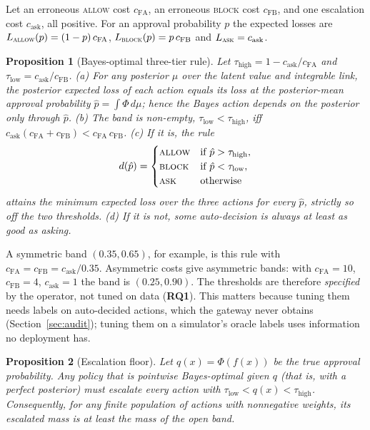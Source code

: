 \documentclass[11pt]{article}
\newtheorem{proposition}{Proposition}
\newcommand{\RQ}[1]{\textbf{RQ#1}}
\begin{document}
Let an erroneous \textsc{allow} cost $c_{\text{FA}}$, an erroneous
\textsc{block} cost $c_{\text{FB}}$, and one escalation cost $c_{\text{ask}}$,
all positive. For an approval probability $p$ the expected losses are
$L_{\textsc{allow}}(p) = (1-p)\,c_{\text{FA}}$,
$L_{\textsc{block}}(p) = p\,c_{\text{FB}}$ and $L_{\textsc{ask}} = c_{\text{ask}}$.

\begin{proposition}[Bayes-optimal three-tier rule]\label{prop:chow}
Let $\tau_{\text{high}} = 1 - c_{\text{ask}}/c_{\text{FA}}$ and
$\tau_{\text{low}} = c_{\text{ask}}/c_{\text{FB}}$.
(a) For any posterior $\mu$ over the latent value and integrable link, the
posterior expected loss of each action equals its loss at the posterior-mean
approval probability $\hat p = \int \Phi\,d\mu$; hence the Bayes action
depends on the posterior only through $\hat p$.
(b) The band is non-empty, $\tau_{\text{low}} < \tau_{\text{high}}$, iff
$c_{\text{ask}}(c_{\text{FA}} + c_{\text{FB}}) < c_{\text{FA}}\,c_{\text{FB}}$.
(c) If it is, the rule
\begin{equation}\label{eq:decision}
    d(\hat p) =
    \begin{cases}
        \textsc{allow}  & \text{if } \hat p > \tau_{\text{high}}, \\
        \textsc{block}  & \text{if } \hat p < \tau_{\text{low}}, \\
        \textsc{ask}    & \text{otherwise}
    \end{cases}
\end{equation}
attains the minimum expected loss over the three actions for every $\hat p$,
strictly so off the two thresholds.
(d) If it is not, some auto-decision is always at least as good as asking.
\end{proposition}

A symmetric band $(0.35, 0.65)$, for example, is this rule with
$c_{\text{FA}} = c_{\text{FB}} = c_{\text{ask}}/0.35$. Asymmetric costs give
asymmetric bands: with $c_{\text{FA}} = 10$, $c_{\text{FB}} = 4$,
$c_{\text{ask}} = 1$ the band is $(0.25, 0.90)$. The thresholds are therefore
\emph{specified} by the operator, not tuned on data (\RQ1). This matters
because tuning them needs labels on auto-decided actions, which the gateway
never obtains (Section~\ref{sec:audit}); tuning them on a simulator's oracle
labels uses information no deployment has.

\begin{proposition}[Escalation floor]\label{prop:floor}
Let $q(x) = \Phi(f(x))$ be the true approval probability. Any policy that is
pointwise Bayes-optimal given $q$ (that is, with a perfect posterior) must
escalate every action with $\tau_{\text{low}} < q(x) < \tau_{\text{high}}$.
Consequently, for any finite population of actions with nonnegative weights,
its escalated mass is at least the mass of the open band.
\end{proposition}
\end{document}

